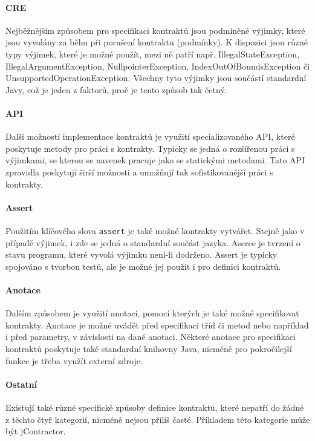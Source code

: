		\paragraph{CRE}
		 Nejběžnějším způsobem pro specifikaci kontraktů jsou podmíněné výjimky, které jsou vyvolány za běhu při porušení kontraktu (podmínky). K dispozici jsou různé typy výjimek, které je možné použít, mezi ně patří např. IllegalStateException, IllegalArgumentException, NullpointerException, IndexOutOfBoundsException či UnsupportedOperationException. Všechny tyto výjimky jsou součástí standardní Javy, což je jeden z faktorů, proč je tento způsob tak četný.
		
		\paragraph{API}
		Další možností implementace kontraktů je využití specializovaného API, které poskytuje metody pro práci s kontrakty. Typicky se jedná o rozšířenou práci s výjimkami, se kterou se navenek pracuje jako se statickými metodami. Tato API zpravidla poskytují širší možnosti a umožňují tak sofistikovanější práci s kontrakty.
		
		\paragraph{Assert}
		Použitím klíčového slova \texttt{assert} je také možné kontrakty vytvářet. Stejně jako v případě výjimek, i zde se jedná o standardní součást jazyka. Aserce je tvrzení o stavu programu, které vyvolá výjimku není-li dodrženo. Assert je typicky spojováno s tvorbou testů, ale je možné jej použít i pro definici kontraktů.
		
		\paragraph{Anotace}
		Dalším způsobem je využití anotací, pomocí kterých je také možné specifikovat kontrakty. Anotace je možné uvádět před specifikaci tříd či metod nebo například i před parametry, v závislosti na dané anotaci. Některé anotace pro specifikaci kontraktů poskytuje také standardní knihovny Java, nicméně pro pokročilejší funkce je třeba využít externí zdroje.
		
		\paragraph{Ostatní}
		Existují také různé specifické způsoby definice kontraktů, které nepatří do žádné z těchto čtyř kategorií, nicméně nejsou příliš časté. Příkladem této kategorie může být jContractor.
	
